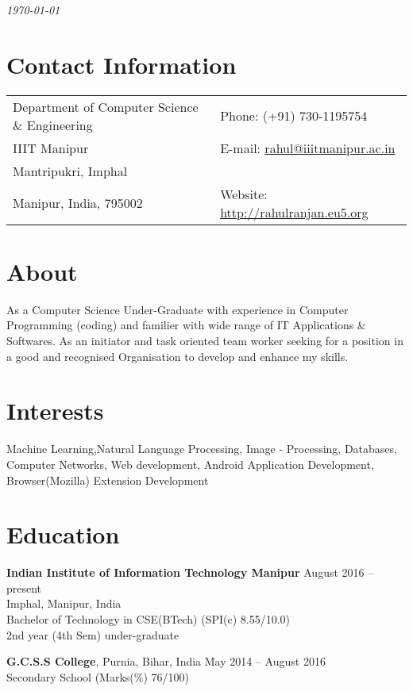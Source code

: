 \documentclass[margin,line]{res}
\begin{document}
 \hfill {\em \today}

\begin{resume}
\section{\sc Contact Information}

\vspace{.05in}
\begin{tabular}{@{}p{3.5in}p{3in}}
Department of Computer Science \& Engineering             & {Phone:}  (+91) 730-1195754 \\
IIIT Manipur 
 & {E-mail:}   \href{mailto:rahul@iiitmanipur.ac.in}{rahul@iiitmanipur.ac.in}\\
Mantripukri, Imphal\\
Manipur, India, 795002  & {Website:} \url{http://rahulranjan.eu5.org}
\end{tabular}
\section{\sc About}
As a Computer Science Under-Graduate with experience in Computer Programming (coding) and familier with wide range of IT
Applications \& Softwares. As an initiator and task oriented team worker seeking for a position in a good and recognised Organisation to
develop and enhance my skills. 

\section{\sc Interests}

Machine Learning,Natural Language Processing, Image - Processing, Databases, Computer Networks, Web development, Android Application Development, Browser(Mozilla) Extension Development

\section{\sc Education}
{\bf Indian Institute of Information Technology Manipur} \hfill August 2016 -- present\\
Imphal, Manipur, India
\\Bachelor of Technology in CSE(BTech) \hfill(SPI(c) 8.55/10.0) \\2nd year (4th Sem) under-graduate 

{\bf G.C.S.S College}, Purnia, Bihar, India \hfill 
May 2014 -- August 2016\\
Secondary School \hfill(Marks(\%) 76/100)


\end{resume}
\end{document}
